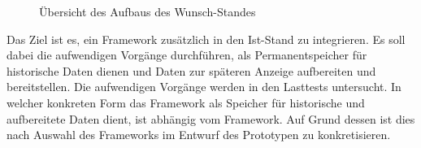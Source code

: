 \begin{figure}[h]
\centering

\caption[Aufbau Wunsch-Stand]{\"{U}bersicht des Aufbaus des Wunsch-Standes}
\label{fig:wunschstand}
\end{figure}
Das Ziel ist es, ein Framework zusätzlich in den Ist-Stand zu integrieren.
Es soll dabei die aufwendigen Vorgänge durchführen, als Permanentspeicher für historische Daten dienen und Daten zur späteren Anzeige aufbereiten und bereitstellen.
Die aufwendigen Vorgänge werden in den Lasttests untersucht.
In welcher konkreten Form das Framework als Speicher für historische und aufbereitete Daten dient, ist abhängig vom Framework.
Auf Grund dessen ist dies nach Auswahl des Frameworks im Entwurf des Prototypen zu konkretisieren.

